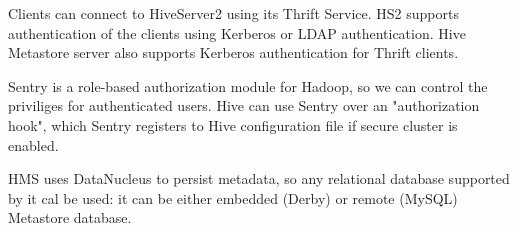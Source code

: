 Clients can connect to HiveServer2 using its Thrift Service. HS2 supports authentication of the clients using Kerberos or LDAP authentication. Hive Metastore server also supports Kerberos authentication for Thrift clients.

Sentry is a role-based authorization module for Hadoop, so we can control the priviliges for authenticated users. Hive can use Sentry over an "authorization hook", which Sentry registers to Hive configuration file if secure cluster is enabled. 

HMS uses DataNucleus to persist metadata, so any relational database supported by it cal be used: it can be either embedded (\eg Derby) or remote (\eg MySQL) Metastore database.